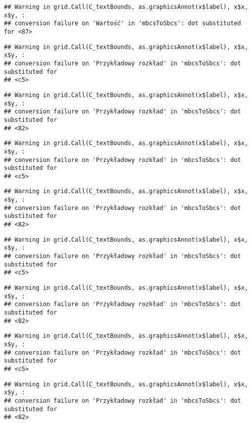 \documentclass[
]{book}
\begin{document}
\begin{verbatim}
## Warning in grid.Call(C_textBounds, as.graphicsAnnot(x$label), x$x, x$y, :
## conversion failure on 'Wartość' in 'mbcsToSbcs': dot substituted for <87>
\end{verbatim}

\begin{verbatim}
## Warning in grid.Call(C_textBounds, as.graphicsAnnot(x$label), x$x, x$y, :
## conversion failure on 'Przykładowy rozkład' in 'mbcsToSbcs': dot substituted for
## <c5>
\end{verbatim}

\begin{verbatim}
## Warning in grid.Call(C_textBounds, as.graphicsAnnot(x$label), x$x, x$y, :
## conversion failure on 'Przykładowy rozkład' in 'mbcsToSbcs': dot substituted for
## <82>
\end{verbatim}

\begin{verbatim}
## Warning in grid.Call(C_textBounds, as.graphicsAnnot(x$label), x$x, x$y, :
## conversion failure on 'Przykładowy rozkład' in 'mbcsToSbcs': dot substituted for
## <c5>
\end{verbatim}

\begin{verbatim}
## Warning in grid.Call(C_textBounds, as.graphicsAnnot(x$label), x$x, x$y, :
## conversion failure on 'Przykładowy rozkład' in 'mbcsToSbcs': dot substituted for
## <82>
\end{verbatim}

\begin{verbatim}
## Warning in grid.Call(C_textBounds, as.graphicsAnnot(x$label), x$x, x$y, :
## conversion failure on 'Przykładowy rozkład' in 'mbcsToSbcs': dot substituted for
## <c5>
\end{verbatim}

\begin{verbatim}
## Warning in grid.Call(C_textBounds, as.graphicsAnnot(x$label), x$x, x$y, :
## conversion failure on 'Przykładowy rozkład' in 'mbcsToSbcs': dot substituted for
## <82>
\end{verbatim}

\begin{verbatim}
## Warning in grid.Call(C_textBounds, as.graphicsAnnot(x$label), x$x, x$y, :
## conversion failure on 'Przykładowy rozkład' in 'mbcsToSbcs': dot substituted for
## <c5>
\end{verbatim}

\begin{verbatim}
## Warning in grid.Call(C_textBounds, as.graphicsAnnot(x$label), x$x, x$y, :
## conversion failure on 'Przykładowy rozkład' in 'mbcsToSbcs': dot substituted for
## <82>
\end{verbatim}
\end{document}
